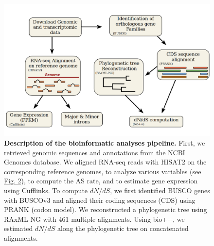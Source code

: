 \begin{figure}[t]   
    \begin{center}                                                                       
        \includegraphics[width=\textwidth] {Figure11_supp.pdf}
    \end{center}                                                                       
    \caption[Description of the bioinformatic analyses pipeline]{\textbf{Description of the bioinformatic analyses pipeline.} First, we retrieved genomic sequences and annotations from the NCBI Genomes database. We aligned RNA-seq reads with HISAT2 on the corresponding reference genomes, to analyze various variables (see \hyperref[fig:AS2]{Fig. 2}), to compute the AS rate, and to estimate gene expression using Cufflinks. To compute ${dN}/{dS}$, we first identified BUSCO genes with BUSCOv3 and aligned their coding sequences (CDS) using PRANK (codon model). We reconstructed a phylogenetic tree using RAxML-NG with 461 multiple alignments. Using bio++, we estimated ${dN}/{dS}$ along the phylogenetic tree on concatenated alignments.} 
    \label{supp_fig:AS11}
\end{figure}
